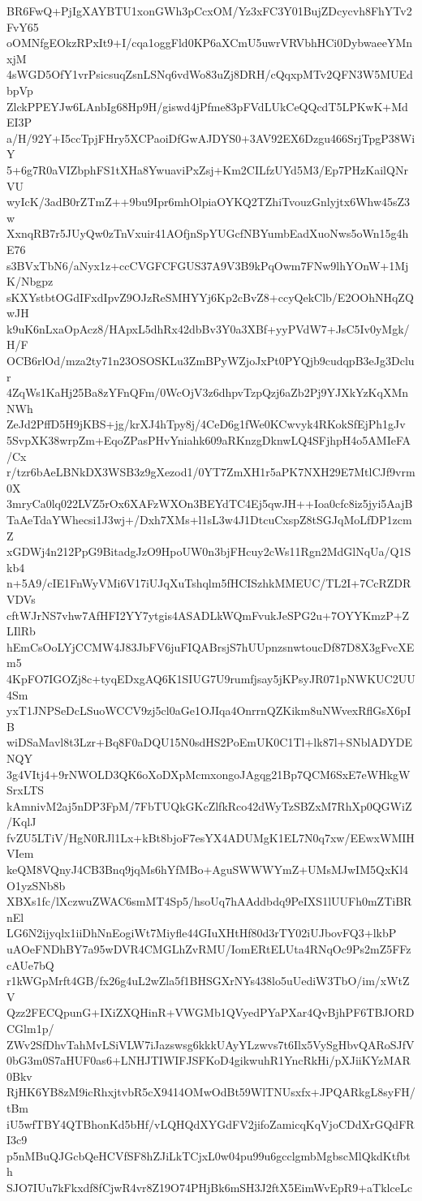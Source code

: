 BR6FwQ+PjIgXAYBTU1xonGWh3pCcxOM/Yz3xFC3Y01BujZDcycvh8FhYTv2FvY65
oOMNfgEOkzRPxIt9+I/cqa1oggFld0KP6aXCmU5uwrVRVbhHCi0DybwaeeYMnxjM
4sWGD5OfY1vrPsicsuqZsnLSNq6vdWo83uZj8DRH/cQqxpMTv2QFN3W5MUEdbpVp
ZlckPPEYJw6LAnbIg68Hp9H/giswd4jPfme83pFVdLUkCeQQcdT5LPKwK+MdEI3P
a/H/92Y+I5ccTpjFHry5XCPaoiDfGwAJDYS0+3AV92EX6Dzgu466SrjTpgP38WiY
5+6g7R0aVIZbphFS1tXHa8YwuaviPxZsj+Km2CILfzUYd5M3/Ep7PHzKailQNrVU
wyIcK/3adB0rZTmZ++9bu9Ipr6mhOlpiaOYKQ2TZhiTvouzGnlyjtx6Whw45sZ3w
XxnqRB7r5JUyQw0zTnVxuir41AOfjnSpYUGcfNBYumbEadXuoNws5oWn15g4hE76
s3BVxTbN6/aNyx1z+ccCVGFCFGUS37A9V3B9kPqOwm7FNw9lhYOnW+1MjK/Nbgpz
sKXYstbtOGdIFxdIpvZ9OJzReSMHYYj6Kp2cBvZ8+ccyQekClb/E2OOhNHqZQwJH
k9uK6nLxaOpAcz8/HApxL5dhRx42dbBv3Y0a3XBf+yyPVdW7+JsC5Iv0yMgk/H/F
OCB6rlOd/mza2ty71n23OSOSKLu3ZmBPyWZjoJxPt0PYQjb9cudqpB3eJg3Dclur
4ZqWs1KaHj25Ba8zYFnQFm/0WcOjV3z6dhpvTzpQzj6aZb2Pj9YJXkYzKqXMnNWh
ZeJd2PffD5H9jKBS+jg/krXJ4hTpy8j/4CeD6g1fWe0KCwvyk4RKokSfEjPh1gJv
5SvpXK38wrpZm+EqoZPasPHvYniahk609aRKnzgDknwLQ4SFjhpH4o5AMIeFA/Cx
r/tzr6bAeLBNkDX3WSB3z9gXezod1/0YT7ZmXH1r5aPK7NXH29E7MtlCJf9vrm0X
3mryCa0lq022LVZ5rOx6XAFzWXOn3BEYdTC4Ej5qwJH++Ioa0cfc8iz5jyi5AajB
TaAeTdaYWhecsi1J3wj+/Dxh7XMs+l1sL3w4J1DtcuCxspZ8tSGJqMoLfDP1zcmZ
xGDWj4n212PpG9BitadgJzO9HpoUW0n3bjFHcuy2cWs11Rgn2MdGlNqUa/Q1Skb4
n+5A9/cIE1FnWyVMi6V17iUJqXuTshqlm5fHCISzhkMMEUC/TL2I+7CcRZDRVDVs
cftWJrNS7vhw7AfHFI2YY7ytgis4ASADLkWQmFvukJeSPG2u+7OYYKmzP+ZLIlRb
hEmCsOoLYjCCMW4J83JbFV6juFIQABrsjS7hUUpnzsnwtoucDf87D8X3gFvcXEm5
4KpFO7IGOZj8c+tyqEDxgAQ6K1SIUG7U9rumfjsay5jKPsyJR071pNWKUC2UU4Sm
yxT1JNPSeDcLSuoWCCV9zj5cl0aGe1OJIqa4OnrrnQZKikm8uNWvexRflGsX6pIB
wiDSaMavl8t3Lzr+Bq8F0aDQU15N0sdHS2PoEmUK0C1Tl+lk87l+SNblADYDENQY
3g4VItj4+9rNWOLD3QK6oXoDXpMcmxongoJAgqg21Bp7QCM6SxE7eWHkgWSrxLTS
kAmnivM2aj5nDP3FpM/7FbTUQkGKcZlfkRco42dWyTzSBZxM7RhXp0QGWiZ/KqlJ
fvZU5LTiV/HgN0RJl1Lx+kBt8bjoF7esYX4ADUMgK1EL7N0q7xw/EEwxWMIHVIem
keQM8VQnyJ4CB3Bnq9jqMs6hYfMBo+AguSWWWYmZ+UMsMJwIM5QxKl4O1yzSNb8b
XBXs1fc/lXczwuZWAC6smMT4Sp5/hsoUq7hAAddbdq9PeIXS1lUUFh0mZTiBRnEl
LG6N2ijyqlx1iiDhNnEogiWt7Miyfle44GIuXHtHf80d3rTY02iUJbovFQ3+lkbP
uAOeFNDhBY7a95wDVR4CMGLhZvRMU/IomERtELUta4RNqOc9Ps2mZ5FFzcAUe7bQ
r1kWGpMrft4GB/fx26g4uL2wZla5f1BHSGXrNYs438lo5uUediW3TbO/im/xWtZV
Qzz2FECQpunG+IXiZXQHinR+VWGMb1QVyedPYaPXar4QvBjhPF6TBJORDCGlm1p/
ZWv2SfDhvTahMvLSiVLW7iJazswsg6kkkUAyYLzwvs7t6Ilx5VySgHbvQARoSJfV
0bG3m0S7aHUF0as6+LNHJTIWIFJSFKoD4gikwuhR1YncRkHi/pXJiiKYzMAR0Bkv
RjHK6YB8zM9icRhxjtvbR5cX9414OMwOdBt59WlTNUsxfx+JPQARkgL8syFH/tBm
iU5wfTBY4QTBhonKd5bHf/vLQHQdXYGdFV2jifoZamicqKqVjoCDdXrGQdFRI3c9
p5nMBuQJGcbQeHCVfSF8hZJiLkTCjxL0w04pu99u6gcclgmbMgbscMlQkdKtfbth
SJO7IUu7kFkxdf8fCjwR4vr8Z19O74PHjBk6mSH3J2ftX5EimWvEpR9+aTklceLc
